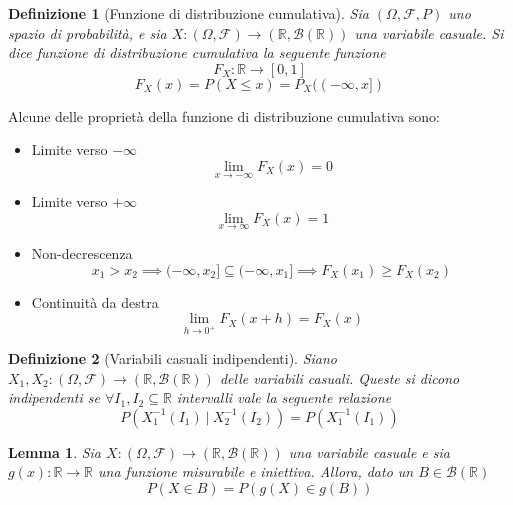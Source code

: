 \documentclass{article}
\newtheorem{lemma}{Lemma}
\newtheorem{definition}{Definizione}
\begin{document}
        \begin{definition}[Funzione di distribuzione cumulativa]
            Sia $(\Omega, \mathcal{F}, P)$ uno spazio di probabilità, e sia $X: (\Omega, \mathcal{F}) \rightarrow (\mathbb{R}, \mathcal{B}(\mathbb{R}))$ una variabile casuale.
            Si dice funzione di distribuzione cumulativa la seguente funzione
            \[
                F_{X}: \mathbb{R} \rightarrow [0, 1]
            \]
            \[
                F_{X}(x) = P(X \leq x) = P_{X}((-\infty, x])
            \]
        \end{definition}

        Alcune delle proprietà della funzione di distribuzione cumulativa sono:
        \begin{itemize}
            \item Limite verso $-\infty$
            \[
                \lim_{x \rightarrow -\infty} F_{X}(x) = 0
            \]

            \item Limite verso $+\infty$
            \[
                \lim_{x \rightarrow \infty} F_{X}(x) = 1
            \]

            \item Non-decrescenza
            \[
                x_{1} > x_{2} \implies (-\infty, x_{2}] \subseteq (-\infty, x_{1}] \implies F_{X}(x_{1}) \geq F_{X}(x_{2})
            \]

            \item Continuità da destra
            \[
                \lim_{h \rightarrow 0^{+}} F_{X}(x + h) = F_{X}(x)
            \]
        \end{itemize}

        \begin{definition}[Variabili casuali indipendenti]
            Siano $X_{1}, X_{2}: (\Omega, \mathcal{F}) \rightarrow (\mathbb{R}, \mathcal{B}(\mathbb{R}))$ delle variabili casuali.
            Queste si dicono indipendenti se $\forall I_{1}, I_{2} \subseteq \mathbb{R}$ intervalli vale la seguente relazione
            \[
                P(X_{1}^{-1}(I_{1}) \: | \: X_{2}^{-1}(I_{2})) = P(X_{1}^{-1}(I_{1}))
            \]
        \end{definition}

        \vspace{10pt}
        \begin{lemma}
            Sia $X: (\Omega, \mathcal{F}) \rightarrow (\mathbb{R}, \mathcal{B}(\mathbb{R}))$ una variabile casuale e sia $g(x): \mathbb{R} \rightarrow \mathbb{R}$ una funzione misurabile e iniettiva.
            Allora, dato un $B \in \mathcal{B}(\mathbb{R})$
            \[
                P(X \in B) = P(g(X) \in g(B))
            \]
        \end{lemma}
\end{document}
